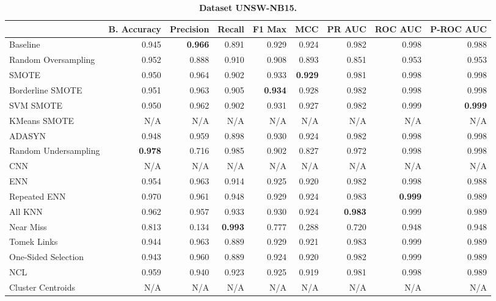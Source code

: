 \begin{table}[H]
    \centering
    \setlength\tabcolsep{2pt}
    \begin{tabularx}{\textwidth}{lRRRRRRRR}
        & B. Accuracy & Precision & Recall & F1 Max & MCC & PR AUC & ROC AUC & P-ROC AUC \\
        \midrule
        Baseline & 0.945 & \textbf{0.966} & 0.891 & 0.929 & 0.924 & 0.982 & 0.998 & 0.988 \\
        Random Oversampling & 0.952 & 0.888 & 0.910 & 0.908 & 0.893 & 0.851 & 0.953 & 0.953 \\
        SMOTE & 0.950 & 0.964 & 0.902 & 0.933 & \textbf{0.929} & 0.981 & 0.998 & 0.998 \\
        Borderline SMOTE & 0.951 & 0.963 & 0.905 & \textbf{0.934} & 0.928 & 0.982 & 0.998 & 0.998 \\
        SVM SMOTE & 0.950 & 0.962 & 0.902 & 0.931 & 0.927 & 0.982 & 0.999 & \textbf{0.999} \\
        KMeans SMOTE & N/A & N/A & N/A & N/A & N/A & N/A & N/A & N/A \\
        ADASYN & 0.948 & 0.959 & 0.898 & 0.930 & 0.924 & 0.982 & 0.998 & 0.998 \\
        Random Undersampling & \textbf{0.978} & 0.716 & 0.985 & 0.902 & 0.827 & 0.972 & 0.998 & 0.998 \\
        CNN & N/A & N/A & N/A & N/A & N/A & N/A & N/A & N/A \\
        ENN & 0.954 & 0.963 & 0.914 & 0.925 & 0.920 & 0.982 & 0.998 & 0.988 \\
        Repeated ENN & 0.970 & 0.961 & 0.948 & 0.929 & 0.924 & 0.983 & \textbf{0.999} & 0.989 \\
        All KNN & 0.962 & 0.957 & 0.933 & 0.930 & 0.924 & \textbf{0.983} & 0.999 & 0.989 \\
        Near Miss & 0.813 & 0.134 & \textbf{0.993} & 0.777 & 0.288 & 0.720 & 0.948 & 0.948 \\
        Tomek Links & 0.944 & 0.963 & 0.889 & 0.929 & 0.921 & 0.983 & 0.999 & 0.989 \\
        One-Sided Selection & 0.943 & 0.960 & 0.889 & 0.924 & 0.920 & 0.982 & 0.999 & 0.989 \\
        NCL & 0.959 & 0.940 & 0.923 & 0.925 & 0.919 & 0.981 & 0.998 & 0.989 \\
        Cluster Centroids & N/A & N/A & N/A & N/A & N/A & N/A & N/A & N/A \\
    \end{tabularx}
    \vspace{1mm}
    \caption{\textbf{Dataset UNSW-NB15.}}
\end{table}
